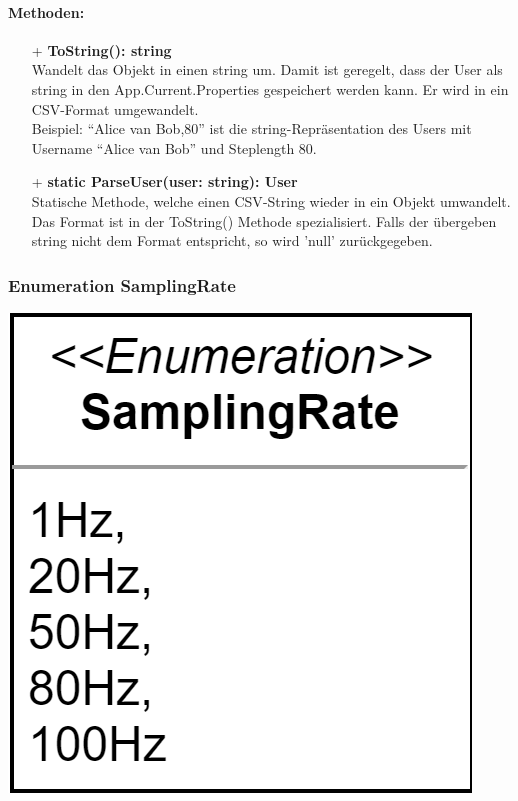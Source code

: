 \documentclass[a4paper,12pt]{article}
\begin{document}
	\paragraph{Methoden:}
	\begin{itemize}
		\item[+] \textbf{ToString(): string}\\Wandelt das Objekt in einen string um. Damit ist geregelt, dass der User als string in den App.Current.Properties gespeichert werden kann. Er wird in ein \Gls{CSV}-Format umgewandelt.\\
		Beispiel: ``Alice van Bob,80'' ist die string-Repräsentation des Users mit Username ``Alice van Bob'' und Steplength 80.\\
		\item[+] \textbf{static ParseUser(user: string): User}\\Statische Methode, welche einen \Gls{CSV}-String wieder in  ein Objekt umwandelt. Das Format ist in der ToString() Methode spezialisiert. Falls der übergeben string nicht dem Format entspricht, so wird 'null' zurückgegeben.\\
	\end{itemize}

	\begin{minipage}[b]{0.6\textwidth}
		\subsubsection{Enumeration SamplingRate}
	\end{minipage}
	\begin{minipage}[c]{0.5\textwidth}
		\includegraphics{bilder/EMKlassen/SamplingRateEnum.png}
	\end{minipage}
\end{document}

